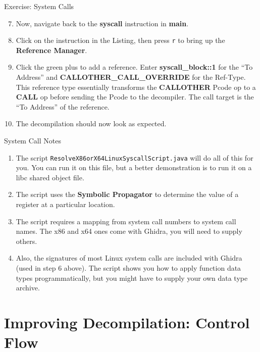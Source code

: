 \documentclass{beamer}
\begin{document}
\begin{frame}
\begin{block}{Exercise: System Calls}
\begin{enumerate}
\setcounter{enumi}{6}
\item Now, navigate back to the \textbf{syscall} instruction in \textbf{main}.
\item Click on the instruction in the Listing, then press \texttt{r} to bring up the \textbf{Reference Manager}.
\item Click the green plus to add a reference.  Enter \textbf{syscall\_block::1} for the ``To Address'' and \textbf{CALLOTHER\_CALL\_OVERRIDE} for the Ref-Type.
This reference type essentially transforms the \textbf{CALLOTHER} Pcode op to a \textbf{CALL} op before sending the Pcode to the decompiler.  The call target is the ``To Address''
of the reference.
\item[] The decompilation should now look as expected.
\end{enumerate}
\end{block}
\end{frame}

\begin{frame}
\begin{block}{System Call Notes}
\begin{enumerate}
\item The script \texttt{ResolveX86orX64LinuxSyscallScript.java} will do all of this for you. You can run it on this file, but a better demonstration is to run it on a
libc shared object file.
\item The script uses the \textbf{Symbolic Propagator} to determine the value of a register at a particular location.
\item The script requires a mapping from system call numbers to system call names.  The x86 and x64 ones come with Ghidra, you will need to supply others.
\item Also, the signatures of most Linux system calls are included with Ghidra (used in step 6 above).  The script shows you how to apply function data types programmatically,
but you might have to supply your own data type archive.
\end{enumerate}
\end{block}
\end{frame}


\section{Improving Decompilation: Control Flow}
\end{document}
